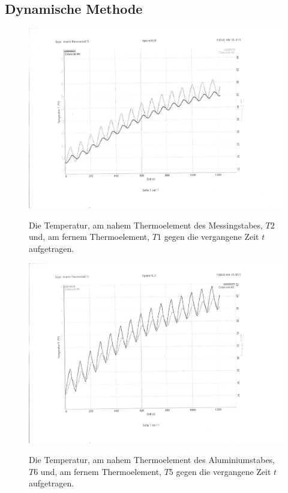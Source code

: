 \subsection{Dynamische Methode}
\begin{figure}
	\centering
	\caption{Die Temperatur, am nahem Thermoelement des Messingstabes, $T2$ und, am fernem Thermoelement, $T1$ gegen die vergangene Zeit $t$ aufgetragen.}
	\includegraphics[width=\linewidth-70pt,height=\textheight-70pt,keepaspectratio]{content/Bilder/T1T2-rotated.pdf}
	\label{fig:Graph5}
\end{figure}
\begin{table}
	\centering
	\caption{Die aus dem Graphen in Abbildung \ref{fig:Graph5} entnommenen Werte für die Phasendifferenz $\Delta t$ die Amplitude am nahem Thermoelement des breitem Messingstabes $A_\text{nah}$ und am fernem Thermoelement $A_\text{fern}$.}
	
\end{table}
\begin{figure}
	\centering
	\caption{Die Temperatur, am nahem Thermoelement des Aluminiumstabes, $T6$ und, am fernem Thermoelement, $T5$ gegen die vergangene Zeit $t$ aufgetragen.}
	\includegraphics[width=\linewidth-70pt,height=\textheight-70pt,keepaspectratio]{content/Bilder/T5T6-rotated.pdf}
	\label{fig:Graph6}
\end{figure}
